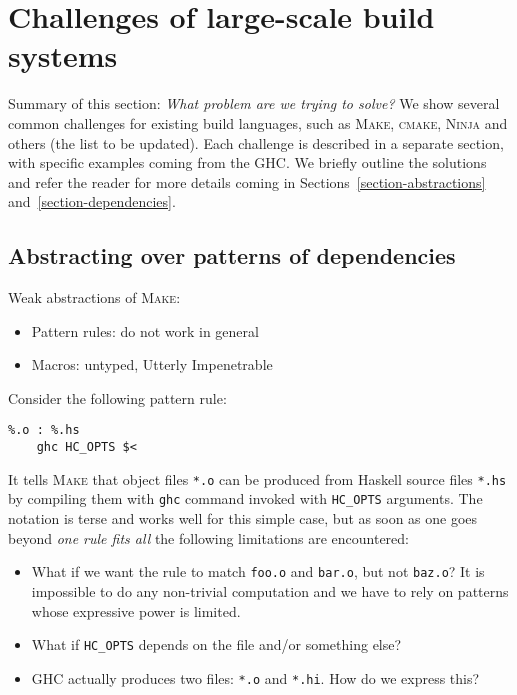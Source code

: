 \section{Challenges of large-scale build systems}

Summary of this section: \emph{What problem are we trying to solve?} We show several
common challenges for existing build languages, such as \textsc{Make},
\textsc{cmake}, \textsc{Ninja} and others (the list to be updated). Each
challenge is described in a separate section, with specific examples coming from
the GHC. We briefly outline the solutions and refer the reader for more details
coming in Sections~\ref{section-abstractions} and~\ref{section-dependencies}.

\subsection{Abstracting over patterns of dependencies}

Weak abstractions of \textsc{Make}:
\begin{itemize}
  \item Pattern rules: do not work in general
  \item Macros: untyped, Utterly Impenetrable 
\end{itemize}

\noindent Consider the following pattern rule:

\begin{verbatim}
%.o : %.hs
    ghc HC_OPTS $<
\end{verbatim}

\noindent It tells \textsc{Make} that object files \texttt{*.o} can be produced
from Haskell source files \texttt{*.hs} by compiling them with \texttt{ghc}
command invoked with \texttt{HC\_OPTS} arguments. The notation is terse and
works well for this simple case, but as soon as one goes beyond \textit{one rule
fits all} the following limitations are encountered:
\begin{itemize}
  \item What if we want the rule to match \texttt{foo.o} and \texttt{bar.o}, but
  not \texttt{baz.o}? It is impossible to do any non-trivial computation and
  we have to rely on patterns whose expressive power is limited.
  \item What if \texttt{HC\_OPTS} depends on the file and/or something else?
  \item GHC actually produces two files: \texttt{*.o} and \texttt{*.hi}. How do
  we express this?
\end{itemize}

